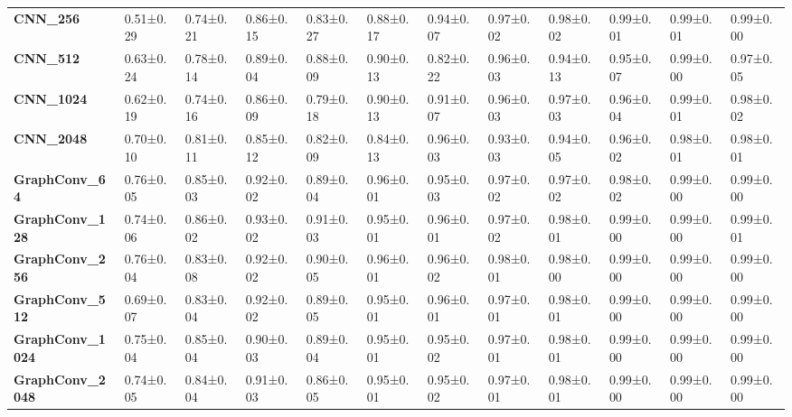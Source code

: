 \begin{tabular}{llllllllllll}
\textbf{CNN\_256       } &         0.51±0.29 &        0.74±0.21 &        0.86±0.15 &       0.83±0.27 &        0.88±0.17 &       0.94±0.07 &        0.97±0.02 &       0.98±0.02 &       0.99±0.01 &        0.99±0.01 &        0.99±0.00 \\
\textbf{CNN\_512       } &         0.63±0.24 &        0.78±0.14 &        0.89±0.04 &       0.88±0.09 &        0.90±0.13 &       0.82±0.22 &        0.96±0.03 &       0.94±0.13 &       0.95±0.07 &        0.99±0.00 &        0.97±0.05 \\
\textbf{CNN\_1024      } &         0.62±0.19 &        0.74±0.16 &        0.86±0.09 &       0.79±0.18 &        0.90±0.13 &       0.91±0.07 &        0.96±0.03 &       0.97±0.03 &       0.96±0.04 &        0.99±0.01 &        0.98±0.02 \\
\textbf{CNN\_2048      } &         0.70±0.10 &        0.81±0.11 &        0.85±0.12 &       0.82±0.09 &        0.84±0.13 &       0.96±0.03 &        0.93±0.03 &       0.94±0.05 &       0.96±0.02 &        0.98±0.01 &        0.98±0.01 \\
\textbf{GraphConv\_64  } &         0.76±0.05 &        0.85±0.03 &        0.92±0.02 &       0.89±0.04 &        0.96±0.01 &       0.95±0.03 &        0.97±0.02 &       0.97±0.02 &       0.98±0.02 &        0.99±0.00 &        0.99±0.00 \\
\textbf{GraphConv\_128 } &         0.74±0.06 &        0.86±0.02 &        0.93±0.02 &       0.91±0.03 &        0.95±0.01 &       0.96±0.01 &        0.97±0.02 &       0.98±0.01 &       0.99±0.00 &        0.99±0.00 &        0.99±0.01 \\
\textbf{GraphConv\_256 } &         0.76±0.04 &        0.83±0.08 &        0.92±0.02 &       0.90±0.05 &        0.96±0.01 &       0.96±0.02 &        0.98±0.01 &       0.98±0.00 &       0.99±0.00 &        0.99±0.00 &        0.99±0.00 \\
\textbf{GraphConv\_512 } &         0.69±0.07 &        0.83±0.04 &        0.92±0.02 &       0.89±0.05 &        0.95±0.01 &       0.96±0.01 &        0.97±0.01 &       0.98±0.01 &       0.99±0.00 &        0.99±0.00 &        0.99±0.00 \\
\textbf{GraphConv\_1024} &         0.75±0.04 &        0.85±0.04 &        0.90±0.03 &       0.89±0.04 &        0.95±0.01 &       0.95±0.02 &        0.97±0.01 &       0.98±0.01 &       0.99±0.00 &        0.99±0.00 &        0.99±0.00 \\
\textbf{GraphConv\_2048} &         0.74±0.05 &        0.84±0.04 &        0.91±0.03 &       0.86±0.05 &        0.95±0.01 &       0.95±0.02 &        0.97±0.01 &       0.98±0.01 &       0.99±0.00 &        0.99±0.00 &        0.99±0.00 \\
\bottomrule
\end{tabular}
